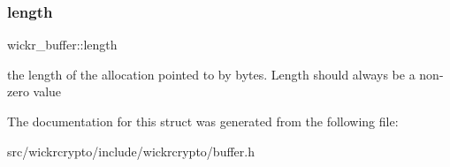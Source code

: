 \subsubsection{\texorpdfstring{length}{length}}
{\footnotesize\ttfamily wickr\+\_\+buffer\+::length}

the length of the allocation pointed to by bytes. Length should always be a non-\/zero value 

The documentation for this struct was generated from the following file\+:\begin{DoxyCompactItemize}
\item 
src/wickrcrypto/include/wickrcrypto/buffer.\+h\end{DoxyCompactItemize}
